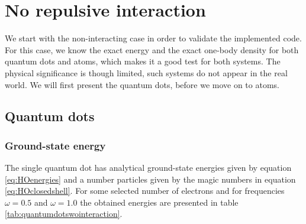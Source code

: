 \newpage
\section{No repulsive interaction}
We start with the non-interacting case in order to validate the implemented code. For this case, we know the exact energy and the exact one-body density for both quantum dots and atoms, which makes it a good test for both systems. The physical significance is though limited, such systems do not appear in the real world. We will first present the quantum dots, before we move on to atoms. 

\subsection{Quantum dots}
\subsubsection{Ground-state energy}
The single quantum dot has analytical ground-state energies given by equation \eqref{eq:HOenergies} and a number particles given by the magic numbers in equation \eqref{eq:HOclosedshell}. For some selected number of electrons and for frequencies $\omega=0.5$ and $\omega=1.0$ the obtained energies are presented in table \eqref{tab:quantumdotswointeraction}.

